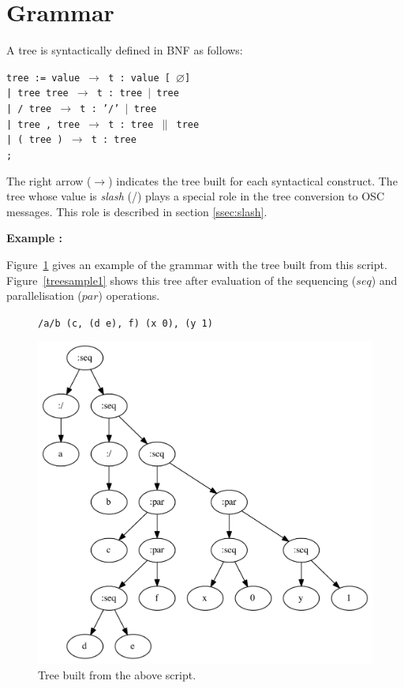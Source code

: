 \documentclass{article}
\newcommand{\exemple}	{\vspace*{1mm}\hspace*{-4mm}\textbf{Example :}}
\newcommand{\code}	[2][0.9]		{\vspace{0mm}\begin{center}\colorbox{mygrey}{
							\begin{minipage}[t]{#1\columnwidth} 
							{\small \texttt{#2}}
							\end{minipage}}\end{center}}
\newcommand{\nulltree}	{\ensuremath{\varnothing}}
\newcommand{\seq}		{\ensuremath{|}}
\newcommand{\paral}		{\ensuremath{\parallel}}
\newcommand{\ula}		{\hspace*{8mm}}
\begin{document}
\section{Grammar}\label{agram}

A tree is syntactically defined in BNF as follows:
\code{tree := value      \hspace*{8mm} $\to$ t : value [ \nulltree ] \\
\ula | tree tree         \hspace*{4mm} $\to$ t : tree \seq\ tree \\
\ula | / tree            \hspace*{9.7mm} $\to$ t : '/' \seq\ tree\\
\ula | tree , tree       \hspace*{0mm}  $\to$ t : tree \paral\ tree \\
\ula | ( tree )          \hspace*{6mm} $\to$ t : tree \\
\ula ;\\
}
The right arrow ($\to$) indicates the tree built for each syntactical construct. 
The tree whose value is \emph{slash} (/) plays a special role in the tree conversion to OSC messages. This role is described in section \ref{ssec:slash}.

\newpage
\exemple

Figure~\ref{parsesample1} gives an example of the grammar with the tree built from this script. Figure~\ref{treesample1} shows this tree after evaluation of the sequencing ($seq$) and parallelisation ($par$) operations.

\begin{figure}[htbp]
\code{/a/b (c, (d e), f) (x 0), (y 1)}
\begin{center}
\includegraphics[width=1.0\columnwidth]{parse/sample1}
\caption{Tree built from the above script.}
\label{parsesample1}
\end{center}
\end{figure}
\end{document}
